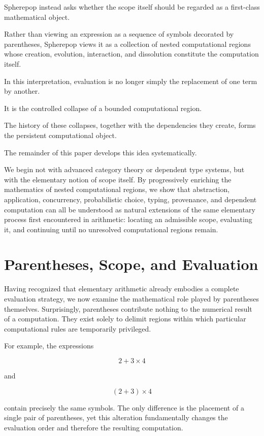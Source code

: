 \documentclass[12pt,oneside]{article}
\theoremstyle{definition}
\theoremstyle{remark}
\begin{document}
Spherepop instead asks whether the scope itself should be regarded as a
first-class mathematical object.

Rather than viewing an expression as a sequence of symbols decorated by
parentheses, Spherepop views it as a collection of nested computational
regions whose creation, evolution, interaction, and dissolution constitute
the computation itself.

In this interpretation, evaluation is no longer simply the replacement of one
term by another.

It is the controlled collapse of a bounded computational region.

The history of these collapses, together with the dependencies they create,
forms the persistent computational object.

The remainder of this paper develops this idea systematically.

We begin not with advanced category theory or dependent type systems, but
with the elementary notion of scope itself.
By progressively enriching the mathematics of nested computational regions,
we show that abstraction, application, concurrency, probabilistic choice,
typing, provenance, and dependent computation can all be understood as
natural extensions of the same elementary process first encountered in
arithmetic: locating an admissible scope, evaluating it, and continuing until
no unresolved computational regions remain.

\section{Parentheses, Scope, and Evaluation}

Having recognized that elementary arithmetic already embodies a complete
evaluation strategy, we now examine the mathematical role played by
parentheses themselves. Surprisingly, parentheses contribute nothing to the
numerical result of a computation. They exist solely to delimit regions within
which particular computational rules are temporarily privileged.

For example, the expressions

\[
2+3\times4
\]

and

\[
(2+3)\times4
\]

contain precisely the same symbols. The only difference is the placement of a
single pair of parentheses, yet this alteration fundamentally changes the
evaluation order and therefore the resulting computation.
\end{document}
